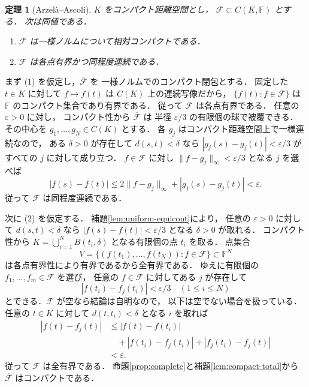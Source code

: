 \documentclass[a5paper,10pt,onecolumn]{jsarticle}
\makeatletter
\theoremstyle{mathnotetheorem}
\newtheorem{theorem}{定理}[section]
\renewcommand{\proofname}{証明}
\renewenvironment{proof}[1][\proofname]{%
  \par\pushQED{\qed}\normalfont\topsep4\p@\@plus2\p@\relax
  \trivlist\item[\hskip\labelsep\bfseries #1]\ignorespaces
}{\popQED\endtrivlist\@endpefalse}
\newcommand{\norm}[1]{\lVert #1\rVert}
\makeatother
\begin{document}
\begin{theorem}[Arzel\`a--Ascoli]\label{thm:ascoli}
$K$ をコンパクト距離空間とし，
$\mathcal F\subset C(K,\mathbb F)$ とする．
次は同値である．
\begin{enumerate}
\item $\mathcal F$ は一様ノルムについて相対コンパクトである．
\item $\mathcal F$ は各点有界かつ同程度連続である．
\end{enumerate}
\end{theorem}
\begin{proof}
まず (1) を仮定し，$\overline{\mathcal F}$ を
一様ノルムでのコンパクト閉包とする．
固定した $t\in K$ に対して
$f\mapsto f(t)$ は $C(K)$ 上の連続写像だから，
$\{f(t):f\in\overline{\mathcal F}\}$
は $\mathbb F$ のコンパクト集合であり有界である．
従って $\mathcal F$ は各点有界である．
任意の $\varepsilon>0$ に対し，
コンパクト性から $\overline{\mathcal F}$ は
半径 $\varepsilon/3$ の有限個の球で被覆できる．
その中心を $g_1,\dots,g_N\in C(K)$ とする．
各 $g_j$ はコンパクト距離空間上で一様連続なので，
ある $\delta>0$ が存在して
$d(s,t)<\delta$ なら
$|g_j(s)-g_j(t)|<\varepsilon/3$
がすべての $j$ に対して成り立つ．
$f\in\mathcal F$ に対し $\norm{f-g_j}_\infty<\varepsilon/3$
となる $j$ を選べば
\[
 |f(s)-f(t)|
 \le2\norm{f-g_j}_\infty+|g_j(s)-g_j(t)|
 <\varepsilon.
\]
従って $\mathcal F$ は同程度連続である．

次に (2) を仮定する．
補題\ref{lem:uniform-equicont}により，
任意の $\varepsilon>0$ に対して
$d(s,t)<\delta$ なら
$|f(s)-f(t)|<\varepsilon/3$
となる $\delta>0$ が取れる．
コンパクト性から
$K=\bigcup_{i=1}^N B(t_i,\delta)$
となる有限個の点 $t_i$ を取る．
点集合
\[
 V=\{(f(t_1),\dots,f(t_N)):f\in\mathcal F\}
 \subset\mathbb F^N
\]
は各点有界性により有界であるから全有界である．
ゆえに有限個の $f_1,\dots,f_m\in\mathcal F$ を選び，
任意の $f\in\mathcal F$ に対してある $j$ が存在して
\[
 |f(t_i)-f_j(t_i)|<\varepsilon/3
 \quad(1\le i\le N)
\]
とできる．$\mathcal F$ が空なら結論は自明なので，
以下は空でない場合を扱っている．
任意の $t\in K$ に対して $d(t,t_i)<\delta$ となる $i$ を取れば
\begin{align*}
 |f(t)-f_j(t)|
 &\le|f(t)-f(t_i)|\\
 &\quad+|f(t_i)-f_j(t_i)|
       +|f_j(t_i)-f_j(t)|\\
 &<\varepsilon.
\end{align*}
従って $\mathcal F$ は全有界である．
命題\ref{prop:complete}と補題\ref{lem:compact-total}から
$\overline{\mathcal F}$ はコンパクトである．
\end{proof}
\end{document}
